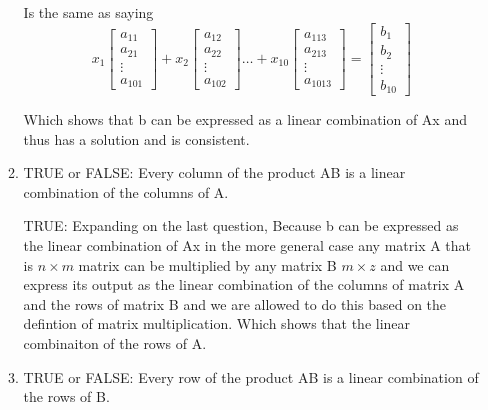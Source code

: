 \documentclass{article}
\begin{document}
\begin{enumerate}
\begin{enumerate}
        Is the same as saying 
        \[
          x_1
          \begin{bmatrix}
            a_{11} \\
            a_{21} \\
            \vdots \\
            a_{101}
          \end{bmatrix}
          + x_2
          \begin{bmatrix}
            a_{12} \\
            a_{22} \\
            \vdots \\
            a_{102}
          \end{bmatrix}
          \dots
          + x_{10}
          \begin{bmatrix}
            a_{113} \\
            a_{213} \\
            \vdots \\
            a_{1013}
          \end{bmatrix}
          =
          \begin{bmatrix}
            b_{1} \\
            b_{2} \\
            \vdots \\
            b_{10}
          \end{bmatrix}
        \]
        \par
        Which shows that b can be expressed as a linear combination of Ax and thus has a solution and is consistent.
        \vspace{0.5cm}
      \item TRUE or FALSE: Every column of the product AB is a linear combination of the columns of A.
        \vspace{0.5cm}
        \par
        TRUE: Expanding on the last question, Because b can be expressed as the linear combination of Ax in the more general case any matrix A that is $n \times m$ matrix can be multiplied by any matrix B $m \times z$ and we can express its output as the linear combination of the columns of matrix A and the rows of matrix B and we are allowed to do this based on the defintion of matrix multiplication. Which shows that the linear combinaiton of the rows of A.
        \vspace{0.5cm}
      \item TRUE or FALSE: Every row of the product AB is a linear combination of the rows of B.

\end{enumerate}
\end{enumerate}
\end{document}
